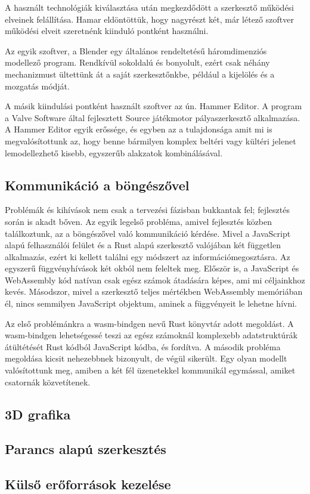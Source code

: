 A használt technológiák kiválasztása után megkezdődött a szerkesztő működési elveinek felállítása.
Hamar eldöntöttük, hogy nagyrészt két, már létező szoftver működési elveit szeretnénk kiinduló
pontként használni.

Az egyik szoftver, a Blender egy általános rendeltetésű háromdimenziós modellező program.
Rendkívül sokoldalú és bonyolult, ezért csak néhány mechanizmust ültettünk át a saját
szerkesztőnkbe, például a kijelölés és a mozgatás módját.

A másik kiindulási pontként használt szoftver az ún. Hammer Editor. A program a Valve Software
által fejlesztett Source játékmotor pályaszerkesztő alkalmazása. A Hammer Editor egyik erőssége,
és egyben az a tulajdonsága amit mi is megvalósítottunk az, hogy benne bármilyen komplex beltéri
vagy kültéri jelenet lemodellezhető kisebb, egyszerűb alakzatok kombinálásával.

\subsection{Kommunikáció a böngészővel}

Problémák és kihívások nem csak a tervezési fázisban bukkantak fel; fejlesztés során is akadt
bőven. Az egyik legelső probléma, amivel fejlesztés közben találkoztunk, az a böngészővel való
kommunikáció kérdése. Mivel a JavaScript alapú felhasználói felület és a Rust alapú szerkesztő
valójában két független alkalmazás, ezért ki kellett találni egy módszert az információmegosztásra.
Az egyszerű függvényhívások két okból nem feleltek meg. Először is, a JavaScript és WebAssembly
kód natívan csak egész számok átadására képes, ami mi céljainkhoz kevés. Másodszor, mivel a
szerkesztő teljes mértékben WebAssembly memóriában él, nincs semmilyen JavaScript objektum, aminek
a függvényeit le lehetne hívni.

Az első problémánkra a wasm-bindgen nevű Rust könyvtár adott megoldást. A wasm-bindgen lehetségessé
teszi az egész számoknál komplexebb adatstruktúrák átültétését Rust kódból JavaScript kódba, és
fordítva. A második probléma megoldása kicsit nehezebbnek bizonyult, de végül sikerült. Egy olyan
modellt valósítottunk meg, amiben a két fél üzenetekkel kommunikál egymással, amiket csatornák
közvetítenek.

\subsection{3D grafika}
\subsection{Parancs alapú szerkesztés}
\subsection{Külső erőforrások kezelése}
